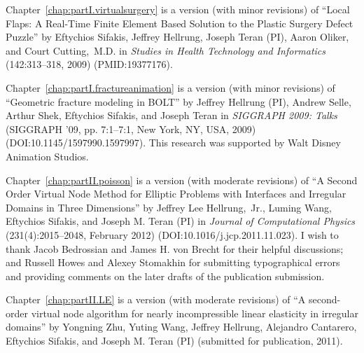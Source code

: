 {Chapter~\ref{chap:partI.virtualsurgery} is a version (with minor revisions) of ``Local Flaps: A Real-Time Finite Element Based Solution to the Plastic Surgery Defect Puzzle'' by Eftychios Sifakis, Jeffrey Hellrung, Joseph Teran (PI), Aaron Oliker, and Court Cutting,~M.D. in \textit{Studies in Health Technology and Informatics} (142:313--318, 2009) (PMID:19377176).

Chapter~\ref{chap:partI.fractureanimation} is a version (with minor revisions) of ``Geometric fracture modeling in BOLT'' by Jeffrey Hellrung (PI), Andrew Selle, Arthur Shek, Eftychios Sifakis, and Joseph Teran in \textit{SIGGRAPH 2009: Talks} (SIGGRAPH '09, pp. 7:1--7:1, New York, NY, USA, 2009) \linebreak[4] (DOI:10.1145/1597990.1597997). This research was supported by Walt Disney Animation Studios.

Chapter~\ref{chap:partII.poisson} is a version (with moderate revisions) of ``A Second Order Virtual Node Method for Elliptic Problems with Interfaces and Irregular Domains in Three Dimensions'' by Jeffrey Lee Hellrung,~Jr., Luming Wang, Eftychios Sifakis, and Joseph M. Teran (PI) in \textit{Journal of Computational Physics} (231(4):2015--2048, February 2012) (DOI:10.1016/j.jcp.2011.11.023). I wish to thank Jacob Bedrossian and James H. von Brecht for their helpful discussions; and Russell Howes and Alexey Stomakhin for submitting typographical errors and providing comments on the later drafts of the publication submission.

Chapter~\ref{chap:partII.LE} is a version (with moderate revisions) of ``A second-order virtual node algorithm for nearly incompressible linear elasticity in irregular domains'' by Yongning Zhu, Yuting Wang, Jeffrey Hellrung, Alejandro Cantarero, Eftychios Sifakis, and Joseph M. Teran (PI) (submitted for publication, 2011).
}



